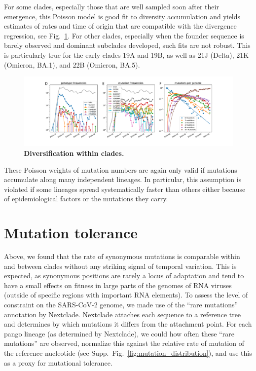\documentclass[aps,rmp, twocolumn]{revtex4}
\begin{document}
For some clades, especially those that are well sampled soon after their emergence, this Poisson model is good fit to diversity accumulation and yields estimates of rates and time of origin that are compatible with the divergence regression, see Fig.~\ref{fig:within_clades}.
For other clades, especially when the founder sequence is barely observed and dominant subclades developed, such fits are not robust.
This is particularly true for the early clades 19A and 19B, as well as 21J (Delta), 21K (Omicron, BA.1), and 22B (Omicron, BA.5).

\begin{figure}
    \includegraphics[width=\textwidth]{figures/counts/20C_counts.pdf}
    \caption{{\bf Diversification within clades.} \label{fig:within_clades}}
\end{figure}

These Poisson weights of mutation numbers are again only valid if mutations accumulate along many independent lineages.
In particular, this assumption is violated if some lineages spread systematically faster than others either because of epidemiological factors or the mutations they carry.


\section*{Mutation tolerance}

Above, we found that the rate of synonymous mutations is comparable within and between clades without any striking signal of temporal variation.
This is expected, as synonymous positions are rarely a locus of adaptation and tend to have a small effects on fitness in large parts of the genomes of RNA viruses \citep{zanini_vivo_2017} (outside of specific regions with important RNA elements).
To assess the level of constraint on the SARS-CoV-2 genome, we made use of the ``rare mutations'' annotation by Nextclade.
Nextclade attaches each sequence to a reference tree and determines by which mutations it differs from the attachment point.
For each pango lineage (as determined by Nextclade), we could how often these ``rare mutations'' are observed, normalize this against the relative rate of mutation of the reference nucleotide (see Supp.~Fig.~\ref{fig:mutation_distribution}), and use this as a proxy for mutational tolerance.
\end{document}

